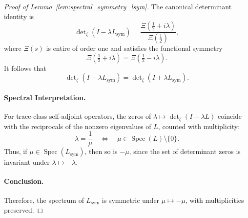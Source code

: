\begin{proof}[Proof of Lemma~\ref{lem:spectral_symmetry_lsym}]
The canonical determinant identity is
\[
\det\nolimits_{\zeta}(I - \lambda L_{\mathrm{sym}}) = \frac{\Xi(\tfrac{1}{2} + i\lambda)}{\Xi(\tfrac{1}{2})},
\]
where \( \Xi(s) \) is entire of order one and satisfies the functional symmetry
\[
\Xi\left(\tfrac{1}{2} + i\lambda\right) = \Xi\left(\tfrac{1}{2} - i\lambda\right).
\]
It follows that
\[
\det\nolimits_{\zeta}(I - \lambda L_{\mathrm{sym}}) = \det\nolimits_{\zeta}(I + \lambda L_{\mathrm{sym}}).
\]

\paragraph{Spectral Interpretation.}
For trace-class self-adjoint operators, the zeros of \( \lambda \mapsto \det\nolimits_{\zeta}(I - \lambda L) \) coincide with the reciprocals of the nonzero eigenvalues of \( L \), counted with multiplicity:
\[
\lambda = \frac{1}{\mu} \quad \Longleftrightarrow \quad \mu \in \operatorname{Spec}(L) \setminus \{0\}.
\]
Thus, if \( \mu \in \operatorname{Spec}(L_{\mathrm{sym}}) \), then so is \( -\mu \), since the set of determinant zeros is invariant under \( \lambda \mapsto -\lambda \).

\paragraph{Conclusion.}
Therefore, the spectrum of \( L_{\mathrm{sym}} \) is symmetric under \( \mu \mapsto -\mu \), with multiplicities preserved.
\end{proof}
